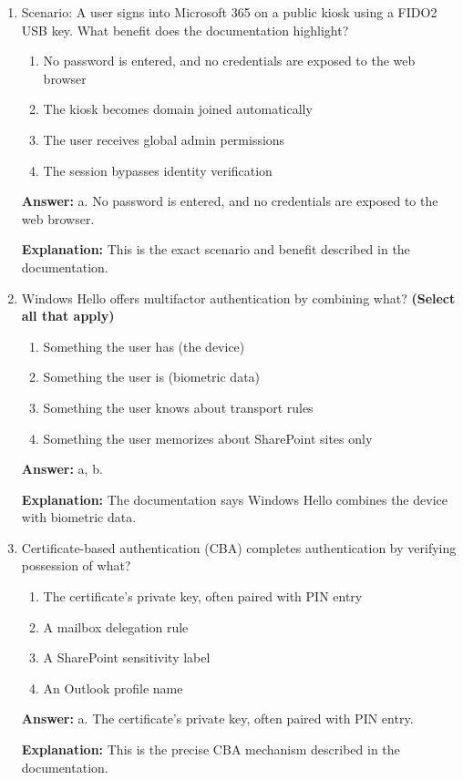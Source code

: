 \documentclass[10pt]{article}
\begin{document}
\begin{enumerate}[leftmargin=*]
\item Scenario: A user signs into Microsoft 365 on a public kiosk using a FIDO2 USB key. What benefit does the documentation highlight?
\begin{enumerate}[label=\alph*., leftmargin=1.5em]
\item No password is entered, and no credentials are exposed to the web browser
\item The kiosk becomes domain joined automatically
\item The user receives global admin permissions
\item The session bypasses identity verification
\end{enumerate}
\textbf{Answer:} a. No password is entered, and no credentials are exposed to the web browser.

\textbf{Explanation:} This is the exact scenario and benefit described in the documentation.

\item Windows Hello offers multifactor authentication by combining what? \textbf{(Select all that apply)}
\begin{enumerate}[label=\alph*., leftmargin=1.5em]
\item Something the user has (the device)
\item Something the user is (biometric data)
\item Something the user knows about transport rules
\item Something the user memorizes about SharePoint sites only
\end{enumerate}
\textbf{Answer:} a, b.

\textbf{Explanation:} The documentation says Windows Hello combines the device with biometric data.

\item Certificate-based authentication (CBA) completes authentication by verifying possession of what?
\begin{enumerate}[label=\alph*., leftmargin=1.5em]
\item The certificate’s private key, often paired with PIN entry
\item A mailbox delegation rule
\item A SharePoint sensitivity label
\item An Outlook profile name
\end{enumerate}
\textbf{Answer:} a. The certificate’s private key, often paired with PIN entry.

\textbf{Explanation:} This is the precise CBA mechanism described in the documentation.


\end{enumerate}
\end{document}
